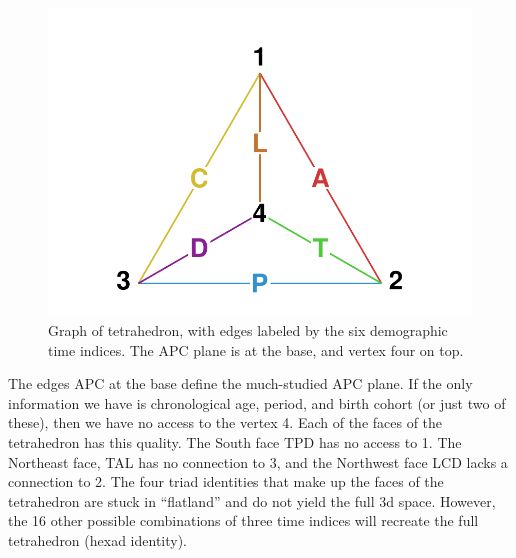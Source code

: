 \documentclass[12pt,oneside,a4paper]{article} %
\begin{document}
\begin{figure}[h!]
\centering
\caption{Graph of tetrahedron, with edges labeled by the six demographic time
indices. The APC plane is at the base, and vertex four on top.}
\label{fig:tet}
\includegraphics[scale=.8]{Figures/TetraHedronVerticesEdges.pdf}
\end{figure}

The edges APC at the base define the much-studied APC plane. If the only
information we have is chronological age, period, and birth cohort (or just two
of these), then we have no access to the vertex 4. Each of the faces of the
tetrahedron has this quality. The South face TPD has no access to 1.
The Northeast face, TAL has no connection to 3, and the Northwest face
LCD lacks a connection to 2. The four triad identities that make up the faces of
the tetrahedron are stuck in ``flatland'' and do not yield the full 3d
space. However, the 16 other possible combinations of three time indices will
recreate the full tetrahedron (hexad identity).


\end{document}

